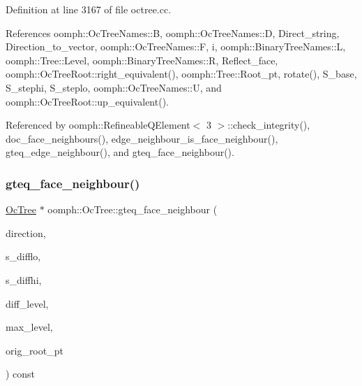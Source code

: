 Definition at line 3167 of file octree.\+cc.



References oomph\+::\+Oc\+Tree\+Names\+::B, oomph\+::\+Oc\+Tree\+Names\+::D, Direct\+\_\+string, Direction\+\_\+to\+\_\+vector, oomph\+::\+Oc\+Tree\+Names\+::F, i, oomph\+::\+Binary\+Tree\+Names\+::L, oomph\+::\+Tree\+::\+Level, oomph\+::\+Binary\+Tree\+Names\+::R, Reflect\+\_\+face, oomph\+::\+Oc\+Tree\+Root\+::right\+\_\+equivalent(), oomph\+::\+Tree\+::\+Root\+\_\+pt, rotate(), S\+\_\+base, S\+\_\+stephi, S\+\_\+steplo, oomph\+::\+Oc\+Tree\+Names\+::U, and oomph\+::\+Oc\+Tree\+Root\+::up\+\_\+equivalent().



Referenced by oomph\+::\+Refineable\+Q\+Element$<$ 3 $>$\+::check\+\_\+integrity(), doc\+\_\+face\+\_\+neighbours(), edge\+\_\+neighbour\+\_\+is\+\_\+face\+\_\+neighbour(), gteq\+\_\+edge\+\_\+neighbour(), and gteq\+\_\+face\+\_\+neighbour().

\mbox{\label{classoomph_1_1OcTree_ad11986ca92b1254b5ea1f4fd2af6f51c}} 
\subsubsection{\texorpdfstring{gteq\+\_\+face\+\_\+neighbour()}{gteq\_face\_neighbour()}\hspace{0.1cm}{\footnotesize\ttfamily [2/2]}}
{\footnotesize\ttfamily \hyperlink{classoomph_1_1OcTree}{Oc\+Tree} $\ast$ oomph\+::\+Oc\+Tree\+::gteq\+\_\+face\+\_\+neighbour (\begin{DoxyParamCaption}\item[{const int \&}]{direction,  }\item[{double \&}]{s\+\_\+difflo,  }\item[{double \&}]{s\+\_\+diffhi,  }\item[{int \&}]{diff\+\_\+level,  }\item[{int}]{max\+\_\+level,  }\item[{\hyperlink{classoomph_1_1OcTreeRoot}{Oc\+Tree\+Root} $\ast$}]{orig\+\_\+root\+\_\+pt }\end{DoxyParamCaption}) const\hspace{0.3cm}{\ttfamily [private]}}



